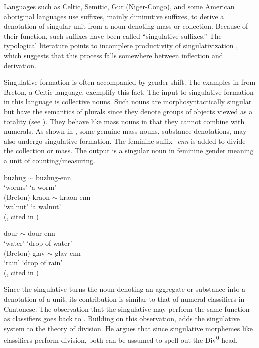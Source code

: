 \documentclass[output=paper,colorlinks,citecolor=brown,
]{langscibook}
\begin{document}
Languages such as Celtic, Semitic, Gur (Niger-Congo), and some American aboriginal languages use suffixes, mainly diminutive suffixes, to derive a denotation of singular unit from a noun denoting mass or collection. Because of their function, such suffixes have been called ``singulative suffixes.'' The typological literature points to incomplete productivity of singulativization \citep{Stolz2001}, which suggests that this process falls somewhere between inflection and derivation.  

Singulative formation is often accompanied by gender shift. The examples in  from Breton, a Celtic language, exemplify this fact. The input to singulative formation in this language is collective nouns. Such nouns are morphosyntactically singular but have the semantics of plurals since they denote groups of objects viewed as a totality (see \citealt{Acquaviva2015}). They behave like mass nouns in that they cannot combine with numerals. As shown in , some genuine mass nouns, substance denotations, may also undergo singulative formation. The feminine suffix \textit{-enn} is added to divide the collection or mass. The output is a singular noun in feminine gender meaning a unit of counting/measuring. 

\ea\label{ex:21} 
\ea\gll buzhug $\sim$ buzhug-enn \\
`worms' {} {`a worm'} \\ \hfill (Breton) 
\label{ex:21a}
\ex\gll kraon $\sim$ kraon-enn \\
`walnut' {} {`a walnut'} \\ 
\glt \hfill (\citealt{Stump2005}, cited in \citealt{Mathieu2012}) 
\label{ex:21b}
\z\z

\ea\label{ex:22} 
\ea\gll dour $\sim$ dour-enn \\
`water' {} {`drop of water'} \\ \hfill (Breton)
\label{ex:22a}
\ex\gll glav $\sim$ glav-enn \\
`rain' {} {`drop of rain'} \\
\glt \hfill (\citealt{Stump2005}, cited in \citealt{Mathieu2012}) 
\label{ex:22b}
\z\z

\noindent Since the singulative turns the noun denoting an aggregate or substance into a denotation of a unit, its contribution is similar to that of numeral classifiers in Cantonese. The observation that the singulative may perform the same function as classifiers goes back to \citet[26]{Greenberg1972}. Building on this observation, \citet{Mathieu2012,Mathieu2014} adds the singulative system to the theory of division. He argues that since singulative morphemes like classifiers perform division, both can be assumed to spell out the Div\textsuperscript{0} head. 
\end{document}
